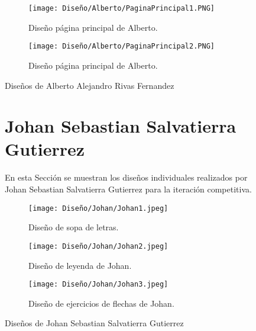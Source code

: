 \begin{figure}[ht!]
  \ContinuedFloat
  \begin{subfigure}{\textwidth}
    \centering
    \texttt{[image: Diseño/Alberto/PaginaPrincipal1.PNG]}
    \caption{Diseño página principal de Alberto.}
    \label{AlbertoPaginaPrincipal1}
  \end{subfigure}

  \begin{subfigure}{\textwidth}
    \centering
    \texttt{[image: Diseño/Alberto/PaginaPrincipal2.PNG]}
    \caption{Diseño página principal de Alberto.}
    \label{AlbertoPaginaPrincipal2}
  \end{subfigure}

  \caption{Diseños de Alberto Alejandro Rivas Fernandez}
  \label{fig:disenyoAlberto}
\end{figure}


\begin{figure}[ht!]
  \section{Johan Sebastian Salvatierra Gutierrez}
  En esta Sección se muestran los diseños individuales realizados por Johan Sebastian Salvatierra Gutierrez para la iteración competitiva.
  \label{sec:disenyoJohan}
  \begin{subfigure}{\textwidth}
    \centering
    \texttt{[image: Diseño/Johan/Johan1.jpeg]}
    \caption{Diseño de sopa de letras.}
    \label{Johan1}
  \end{subfigure}

  \begin{subfigure}{\textwidth}
    \centering
    \texttt{[image: Diseño/Johan/Johan2.jpeg]}
    \caption{Diseño de leyenda de Johan.}
    \label{Johan2}
  \end{subfigure}

  \begin{subfigure}{\textwidth}
    \centering
    \texttt{[image: Diseño/Johan/Johan3.jpeg]}
    \caption{Diseño de ejercicios de flechas de Johan.}
    \label{Johan3}
  \end{subfigure}

  \caption{Diseños de Johan Sebastian Salvatierra Gutierrez}
  \label{fig:disenyoJohan}
\end{figure}

